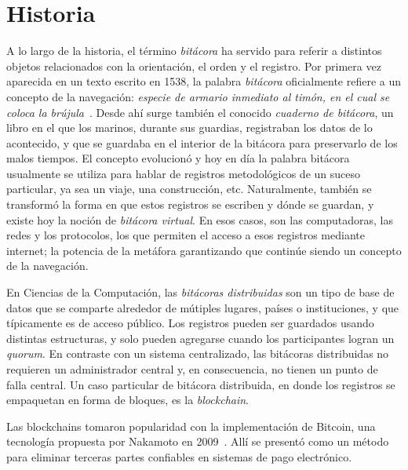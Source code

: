 \section{Historia}


A lo largo de la historia, el término \textit{bitácora} ha servido para referir a
distintos objetos relacionados con la orientación, el orden y el registro. Por
primera vez aparecida en un texto escrito en 1538,
la palabra \textit{bitácora}
oficialmente refiere a un concepto de la navegación: \textit{especie de armario
inmediato al timón, en el cual se coloca la brújula}~\cite{dic.Etimologico}.
Desde ahí surge también
el conocido \textit{cuaderno de bitácora}, un libro en el que los marinos, durante
sus guardias, registraban los datos de lo acontecido, y que se guardaba en el
interior de la bitácora para preservarlo de los malos tiempos. El concepto
evolucionó y hoy en día la palabra bitácora usualmente se utiliza para hablar
de registros metodológicos de un suceso particular, ya sea un viaje, una
construcción, etc. Naturalmente, también se transformó la forma en que estos
registros se escriben y dónde se guardan, y existe hoy la noción de \textit{bitácora
virtual}. En esos casos, son las computadoras, las redes y los protocolos,
los que permiten el acceso a esos registros mediante internet; la potencia de la
metáfora garantizando que continúe siendo un concepto de la navegación.
%

En Ciencias de la Computación, las \textit{bitácoras distribuidas} son un tipo de
base de datos que se comparte
alrededor de mútiples lugares, países o instituciones, y que típicamente es de
acceso público. Los registros pueden ser guardados usando distintas estructuras,
y solo pueden agregarse cuando los participantes logran un \textit{quorum}. En
contraste con un sistema centralizado, las bitácoras distribuidas no requieren
un administrador central y, en consecuencia, no tienen un punto de falla central.
Un caso particular de bitácora distribuida, en donde los registros se empaquetan
en forma de bloques, es la \textit{blockchain}.

Las blockchains tomaron
popularidad con la implementación de Bitcoin, una tecnología propuesta por Nakamoto en
2009~\cite{nakamoto06bitcoin}.
Allí se presentó como un método para eliminar terceras partes confiables en sistemas
de pago electrónico.
%

